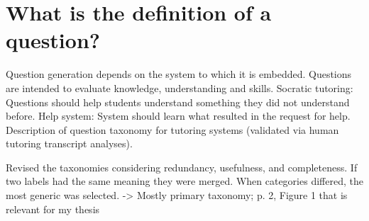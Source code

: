 \begin{comment}
\item How-to-do-it: Scenario settings, how to achieve something, implementation suggestions
\item Seeking-different-solution: Changes to working code; how can this be done differently
\end{itemize}
\end{itemize}
Attributes of recognized answers:
\begin{enumerate}
\item Consise code: 
Code size/length, simplification/complexity reduction. 
Use of comments for left-out details/implementations. 
Code length is distinguishing factor.
\item Using question context: 
For flawed/non-working code, answers usually includes improvement suggestions. 
Best practices, improved readability in addition to working solution suggestion.
\item Pedagogical benefit, since those asking questions learn to write better code.
\item Highlighting important elements: 
"Straight to the point", clearing up misunderstandings, pointing to relevant resources, etc.
\item Step-by-step solution: 
Splitting code into chunks, and explaining each chunk. 
Explanation on how things work. 
Comparison of languages; e.g. "How can I do X in C\#, when I'm used to Java?"
\item Providing links to extra resources: 
Keeping answer short by adding external links. 
A summary of said link should still be included (e.g. if site goes down, is un-available, etc).
\end{enumerate}
\end{comment} 

\section{What is the definition of a question?}
\label{sec:question_definition}

Question generation depends on the system to which it is embedded. 
Questions are intended to evaluate knowledge, understanding and skills. 
Socratic tutoring: Questions should help students understand something they did not understand before. 
Help system: System should learn what resulted in the request for help. 
Description of question taxonomy for tutoring systems (validated via human tutoring transcript analyses).

Revised the taxonomies considering redundancy, usefulness, and completeness. 
If two labels had the same meaning they were merged. 
When categories differed, the most generic was selected.
	-> Mostly primary taxonomy; p. 2, Figure 1 that is relevant for my thesis
\cite{Nielsen2008}


